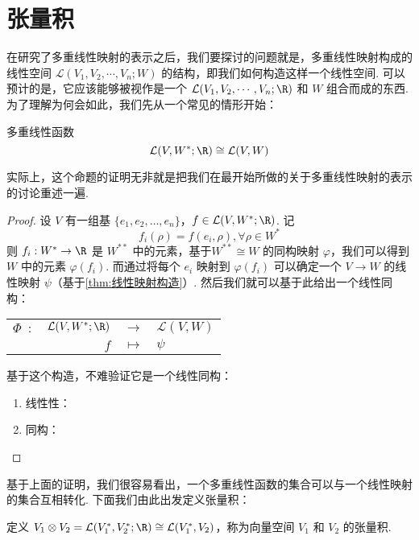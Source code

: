 \section{张量积}

在研究了多重线性映射的表示之后，我们要探讨的问题就是，多重线性映射构成的线性空间 $\mathcal{L}(V_1, V_2, \cdots, V_n; W)$ 的结构，即我们如何构造这样一个线性空间. 可以预计的是，它应该能够被视作是一个 $\mathcal{L}(V_1, V_2, \cdots, V_n; \R)$ 和 $W$ 组合而成的东西. 为了理解为何会如此，我们先从一个常见的情形开始：

\begin{lemma}{}{多重线性函数}
    \[
    \mathcal{L}(V, W^*; \R) \cong \mathcal{L}(V, W)
    \]
\end{lemma}

实际上，这个命题的证明无非就是把我们在最开始所做的关于多重线性映射的表示的讨论重述一遍.

\begin{proof}
    设 $V$ 有一组基 $\{e_1, e_2, \dots, e_n\}$，$f \in \mathcal{L}(V, W^*; \R)$. 记
    \[
    f_i (\rho) = f(e_i, \rho), \forall \rho \in W^*
    \]
    则 $f_i: W^* \to \R$ 是 $W^{**}$ 中的元素，基于$W^{**} \cong W$ 的同构映射 $\varphi$，我们可以得到 $W$ 中的元素 $\varphi(f_i)$. 而通过将每个 $e_i$ 映射到 $\varphi(f_i)$ 可以确定一个 $V \to W$ 的线性映射 $\psi$（基于\autoref{thm:线性映射构造}）. 然后我们就可以基于此给出一个线性同构：
    \begin{center}
        \begin{tabular}{rrcl}
            $\Phi\enspace\colon$      & $\mathcal{L}(V, W^*; \R)$ & $\to$     & $\mathcal{L}(V, W)$ \\
                                   & $f$                      & $\mapsto$ & $\psi$
        \end{tabular}
    \end{center}

    基于这个构造，不难验证它是一个线性同构：
    \begin{enumerate}
        \item 线性性：
        \item 同构：
    \end{enumerate}
\end{proof}

基于上面的证明，我们很容易看出，一个多重线性函数的集合可以与一个线性映射的集合互相转化. 下面我们由此出发定义张量积：

\begin{definition}{}{}
    定义 $V_1 \otimes V_2 = \mathcal{L}(V_1^*, V_2^*; \R) \cong \mathcal{L}(V_1^*, V_2)$，称为向量空间 $V_1$ 和 $V_2$ 的张量积.
\end{definition}

